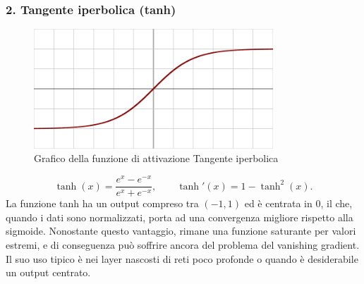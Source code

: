 \documentclass[a4paper,12pt]{report}
\begin{document}
	\subsubsection{2. Tangente iperbolica (tanh)}
	\begin{figure}[H]
		\centering
		\includegraphics[width=0.8\textwidth]{img/tanh.png}
		\caption{Grafico della funzione di attivazione Tangente iperbolica}
	\end{figure}
	\[
	\tanh(x)=\frac{e^x-e^{-x}}{e^x+e^{-x}},\qquad
	\tanh'(x)=1-\tanh^2(x).
	\]
	La funzione tanh ha un output compreso tra $(-1,1)$ ed è centrata in $0$, il che, quando i dati sono normalizzati, porta ad una convergenza migliore rispetto alla sigmoide. Nonostante questo vantaggio, rimane una funzione saturante per valori estremi, e di conseguenza può soffrire ancora del problema del vanishing gradient. Il suo uso tipico è nei layer nascosti di reti poco profonde o quando è desiderabile un output centrato.
	
\end{document}
